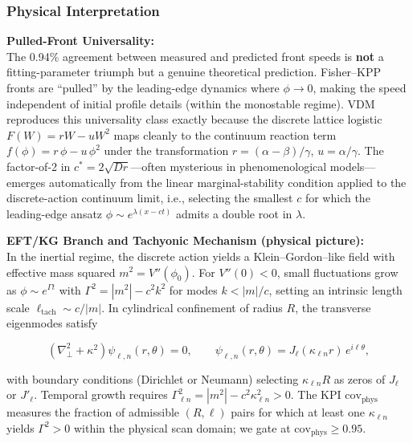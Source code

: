 \documentclass[
]{article}
\begin{document}
\hypertarget{physical-interpretation}{%
\subsubsection{Physical Interpretation}\label{physical-interpretation}}

\textbf{Pulled-Front Universality:}\\
The 0.94\% agreement between measured and predicted front speeds is
\textbf{not} a fitting-parameter triumph but a genuine theoretical
prediction. Fisher--KPP fronts are ``pulled'' by the leading-edge
dynamics where \(\phi \to 0\), making the speed independent of initial
profile details (within the monostable regime). VDM reproduces this
universality class exactly because the discrete lattice logistic
\(F(W) = rW - uW^{2}\) maps cleanly to the continuum reaction term
\(f(\phi) = r\,\phi - u\,\phi^{2}\) under the transformation
\(r = (\alpha-\beta)/\gamma\), \(u = \alpha/\gamma\). The factor-of-2 in
\(c^{\ast} = 2\sqrt{Dr}\)---often mysterious in phenomenological
models---emerges automatically from the linear marginal-stability
condition applied to the discrete-action continuum limit, i.e.,
selecting the smallest \(c\) for which the leading-edge ansatz
\(\phi \sim e^{\lambda(x-ct)}\) admits a double root in \(\lambda\).

\textbf{EFT/KG Branch and Tachyonic Mechanism (physical picture):}\\
In the inertial regime, the discrete action yields a Klein--Gordon--like
field with effective mass squared \(m^{2} = V''(\phi_{0})\). For
\(V''(0)<0\), small fluctuations grow as \(\phi \sim e^{\Gamma t}\) with
\(\Gamma^{2} = |m^{2}| - c^{2}k^{2}\) for modes \(k < |m|/c\), setting
an intrinsic length scale \(\ell_{\mathrm{tach}} \sim c/|m|\). In
cylindrical confinement of radius \(R\), the transverse eigenmodes
satisfy

\[
\left(\nabla^{2}_{\perp} + \kappa^{2}\right)\psi_{\ell,n}(r,\theta) = 0,\qquad \psi_{\ell,n}(r,\theta) = J_{\ell}(\kappa_{\ell n} r)\,e^{i\ell\theta},
\]

with boundary conditions (Dirichlet or Neumann) selecting
\(\kappa_{\ell n} R\) as zeros of \(J_{\ell}\) or \(J'_{\ell}\).
Temporal growth requires
\(\Gamma^{2}_{\ell n} = |m^{2}| - c^{2}\kappa_{\ell n}^{2} > 0\). The
KPI \(\mathrm{cov}_{\mathrm{phys}}\) measures the fraction of admissible
\((R,\ell)\) pairs for which at least one \(\kappa_{\ell n}\) yields
\(\Gamma^{2}>0\) within the physical scan domain; we gate at
\(\mathrm{cov}_{\mathrm{phys}}\ge 0.95\).
\end{document}
